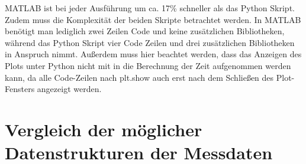 MATLAB ist bei jeder Ausführung um ca. 17\% schneller als das Python Skript. Zudem muss die Komplexität der beiden Skripte betrachtet werden. In MATLAB benötigt man lediglich zwei Zeilen Code und keine zusätzlichen Bibliotheken, während das Python Skript  vier Code Zeilen und drei zusätzlichen Bibliotheken in Anspruch nimmt. Außerdem muss hier beachtet werden, dass das Anzeigen des Plots unter Python nicht mit in die Berechnung der Zeit aufgenommen werden kann, da alle Code-Zeilen nach \glqq plt.show\grqq{} auch erst nach dem Schließen des Plot-Fensters angezeigt werden.


\section{Vergleich der möglicher Datenstrukturen der Messdaten}